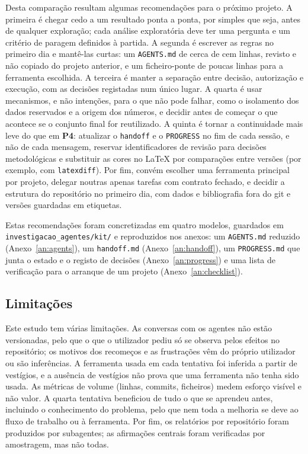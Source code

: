 \documentclass[11pt,a4paper]{article}
\newcommand{\Pquatro}{\textbf{P4}}
\begin{document}
Desta comparação resultam algumas recomendações para o próximo projeto. A primeira é chegar cedo
a um resultado ponta a ponta, por simples que seja, antes de qualquer exploração; cada análise
exploratória deve ter uma pergunta e um critério de paragem definidos à partida. A segunda é
escrever as regras no primeiro dia e mantê-las curtas: um \texttt{AGENTS.md} de cerca de cem
linhas, revisto e não copiado do projeto anterior, e um ficheiro-ponte de poucas linhas para a
ferramenta escolhida. A terceira é manter a separação entre decisão, autorização e execução, com
as decisões registadas num único lugar. A quarta é usar mecanismos, e não intenções, para o que
não pode falhar, como o isolamento dos dados reservados e a origem dos números, e decidir antes de
começar o que acontece se o conjunto final for reutilizado. A quinta é tornar a continuidade mais
leve do que em \Pquatro: atualizar o \texttt{handoff} e o \texttt{PROGRESS} no fim de cada
sessão, e não de cada mensagem, reservar identificadores de revisão para decisões metodológicas e
substituir as cores no LaTeX por comparações entre versões (por exemplo, com \texttt{latexdiff}).
Por fim, convém escolher uma ferramenta principal por projeto, delegar noutras apenas tarefas com
contrato fechado, e decidir a estrutura do repositório no primeiro dia, com dados e bibliografia
fora do git e versões guardadas em etiquetas.

Estas recomendações foram concretizadas em quatro modelos, guardados em
\texttt{investigacao\_\allowbreak agentes/\allowbreak kit/} e reproduzidos nos anexos: um \texttt{AGENTS.md} reduzido
(Anexo~\ref{an:agents}), um \texttt{handoff.md} (Anexo~\ref{an:handoff}), um \texttt{PROGRESS.md}
que junta o estado e o registo de decisões (Anexo~\ref{an:progress}) e uma lista de verificação
para o arranque de um projeto (Anexo~\ref{an:checklist}).

\subsection{Limitações}\label{sec:validade}

Este estudo tem várias limitações. As conversas com os agentes não estão versionadas, pelo que o
que o utilizador pediu só se observa pelos efeitos no repositório; os motivos dos recomeços e as
frustrações vêm do próprio utilizador ou são inferências. A ferramenta usada em cada tentativa foi
inferida a partir de vestígios, e a ausência de vestígios não prova que uma ferramenta não tenha
sido usada. As métricas de volume (linhas, commits, ficheiros) medem esforço visível e não valor.
A quarta tentativa beneficiou de tudo o que se aprendeu antes, incluindo o conhecimento do
problema, pelo que nem toda a melhoria se deve ao fluxo de trabalho ou à ferramenta. Por fim, os
relatórios por repositório foram produzidos por subagentes; as afirmações centrais foram
verificadas por amostragem, mas não todas.
\end{document}
